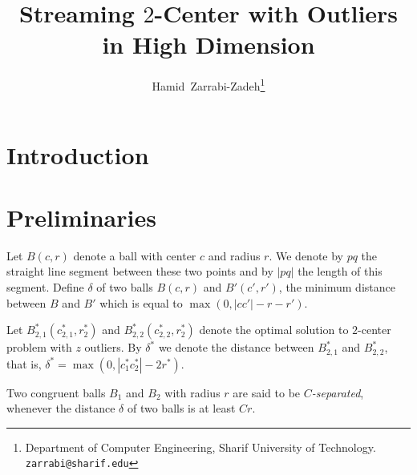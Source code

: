 \documentclass[envcountsame]{cls/cccg15}
\title{Streaming $2$-Center with Outliers in High Dimension}
\author{Hamid~Zarrabi-Zadeh\thanks{Department of Computer Engineering, 
	Sharif University of Technology. 
	{\tt zarrabi@sharif.edu}}
	\and 
}
\newcommand{\card}[1]{\left|{#1}\right|}
\begin{document}
\maketitle
\pagestyle{plain}


\begin{abstract}

\end{abstract}


\section{Introduction}






\section{Preliminaries}
\label{sec:pre}
Let $B(c,r)$ denote a ball with center $c$ and radius $r$. We denote by $pq$ the straight line segment between these two points and by $\card{pq}$ the length of this segment. 
Define $\delta$ of two balls $B(c,r)$ and $B'(c',r')$, the minimum distance between $B$ and $B'$ which is equal to $\max (0, \card{cc'}-r-r')$.

Let $B_{2,1}^*(c_{2,1}^*, r_2^*)$ and $B_{2,2}^*(c_{2,2}^*, r_2^*)$ denote the optimal solution to $2$-center problem with $z$ outliers. By $\delta^*$ we denote the distance between $B_{2,1}^*$ and $B_{2,2}^*$, that is, $\delta^* = \max (0, \card{c_1^*c_2^*} - 2r^*)$. 

Two congruent balls $B_1$ and $B_2$ with radius $r$ are said to be \emph{$C$-separated}, whenever the distance $\delta$ of two balls is at least $Cr$.

\end{document}
